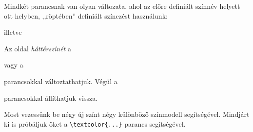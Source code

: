 \documentclass{article}
\begin{document}
Mindkét parancsnak van olyan változata, ahol az előre definiált színnév helyett ott helyben,
,,röptében'' definiált színezést használunk:

\vspace*{2ex} \vspace*{2ex}

illetve

\vspace*{2ex} \vspace*{2ex}

Az oldal \emph{háttérszínét} a

\vspace*{2ex}\vspace*{2ex}

vagy a

\vspace*{2ex}\vspace*{2ex}

parancsokkal változtathatjuk. Végül a

\vspace*{2ex}\vspace*{2ex}

parancsokkal állíthatjuk vissza.

Most vezessünk be négy új színt négy különböző színmodell segítségével. Mindjárt ki is próbáljuk őket a 
\verb!\textcolor{...}! parancs segítségével.

\end{document}
